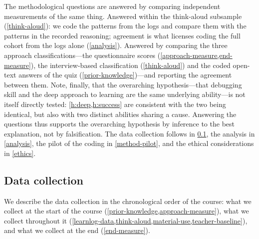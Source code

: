 The methodological questions are answered by comparing independent
measurements of the same thing.
\mqcoding*
Answered within the think-aloud subsample (\cref{think-aloud}): we code
the patterns from the logs and compare them with the patterns in the
recorded reasoning; agreement is what licenses coding the full cohort
from the logs alone (\cref{analysis}).
\mqagreement*
Answered by comparing the three approach classifications---the
questionnaire scores (\cref{approach-measure,end-measure}), the
interview-based classification (\cref{think-aloud}) and the coded
open-text answers of the quiz (\cref{prior-knowledge})---and reporting
the agreement between them.
Note, finally, that the overarching hypothesis---that debugging skill and
the deep approach to learning are the same underlying ability---is not
itself directly tested: \cref{h:deep,h:success} are consistent with the
two being identical, but also with two distinct abilities sharing a cause.
Answering the questions thus supports the overarching hypothesis by
inference to the best explanation, not by falsification.
The data collection follows in \cref{data-collection}, the analysis in
\cref{analysis}, the pilot of the coding in \cref{method-pilot}, and the
ethical considerations in \cref{ethics}.


\subsection{Data collection}
\label{data-collection}

We describe the data collection in the chronological order of the course:
what we collect at the start of the course
(\cref{prior-knowledge,approach-measure}), what we collect throughout it
(\cref{learnlog-data,think-aloud,material-use,teacher-baseline}), and what
we collect at the end (\cref{end-measure}).

